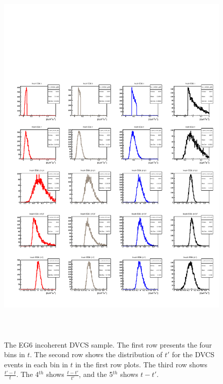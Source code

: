 \documentclass[a4paper,11pt,twoside]{article}
\begin{document}
\begin{figure}[h!]
\centering
\includegraphics[height=19.0cm]{fig/t_tprime_Incoh.pdf}
\caption{The EG6 incoherent DVCS sample. The first row presents the four bins 
in $t$. The second row shows the distribution of $t'$ for the DVCS events in 
each bin in $t$ in the first row plots. The third row shows $\frac{t'-t}{t}$.  
The 4$^{th}$ shows $\frac{t-t'}{t'}$, and the 5$^{th}$ shows $t-t'$.}
\label{fig:tprime_eg6}
\end{figure}

\end{document}
